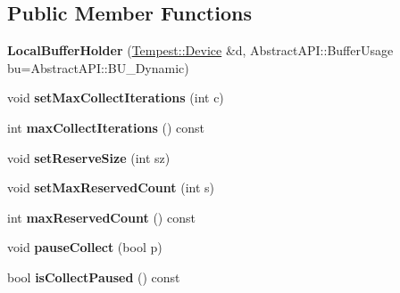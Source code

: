 \subsection*{Public Member Functions}
\begin{DoxyCompactItemize}
\item 
\hypertarget{class_tempest_1_1_local_buffer_holder_ab71d8be70cf8f8c2cbeaf7ded60df55e}{{\bfseries Local\+Buffer\+Holder} (\hyperlink{class_tempest_1_1_device}{Tempest\+::\+Device} \&d, Abstract\+A\+P\+I\+::\+Buffer\+Usage bu=Abstract\+A\+P\+I\+::\+B\+U\+\_\+\+Dynamic)}\label{class_tempest_1_1_local_buffer_holder_ab71d8be70cf8f8c2cbeaf7ded60df55e}

\item 
\hypertarget{class_tempest_1_1_local_buffer_holder_a626ecb104a46b24089a3dab2ec6b5ffc}{void {\bfseries set\+Max\+Collect\+Iterations} (int c)}\label{class_tempest_1_1_local_buffer_holder_a626ecb104a46b24089a3dab2ec6b5ffc}

\item 
\hypertarget{class_tempest_1_1_local_buffer_holder_ae62471b6f4449b50057b642d18d4abae}{int {\bfseries max\+Collect\+Iterations} () const }\label{class_tempest_1_1_local_buffer_holder_ae62471b6f4449b50057b642d18d4abae}

\item 
\hypertarget{class_tempest_1_1_local_buffer_holder_a0e949509b0523f01bc59e18d2b071362}{void {\bfseries set\+Reserve\+Size} (int sz)}\label{class_tempest_1_1_local_buffer_holder_a0e949509b0523f01bc59e18d2b071362}

\item 
\hypertarget{class_tempest_1_1_local_buffer_holder_a26504685571dbcd32bd77e1980370308}{void {\bfseries set\+Max\+Reserved\+Count} (int s)}\label{class_tempest_1_1_local_buffer_holder_a26504685571dbcd32bd77e1980370308}

\item 
\hypertarget{class_tempest_1_1_local_buffer_holder_aa49488cb2afd3fea872fa053496884c8}{int {\bfseries max\+Reserved\+Count} () const }\label{class_tempest_1_1_local_buffer_holder_aa49488cb2afd3fea872fa053496884c8}

\item 
\hypertarget{class_tempest_1_1_local_buffer_holder_a62a1733530a409420b91649fd38ef242}{void {\bfseries pause\+Collect} (bool p)}\label{class_tempest_1_1_local_buffer_holder_a62a1733530a409420b91649fd38ef242}

\item 
\hypertarget{class_tempest_1_1_local_buffer_holder_a359c6e9b71cf0fa5707a41f3d38e2b78}{bool {\bfseries is\+Collect\+Paused} () const }\label{class_tempest_1_1_local_buffer_holder_a359c6e9b71cf0fa5707a41f3d38e2b78}

\end{DoxyCompactItemize}
